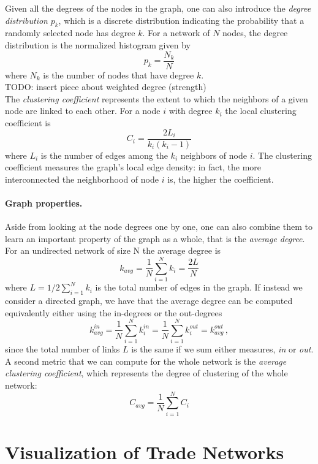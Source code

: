 Given all the degrees of the nodes in the graph, one can also introduce the \textit{degree distribution} $p_k$, which is a discrete distribution indicating the probability that a randomly selected node has degree $k$. For a network of $N$ nodes, the degree distribution is the normalized histogram given by 
\[ p_k = \frac{N_k}{N} \]
where $N_k$ is the number of nodes that have degree $k$. \\

TODO: insert piece about weighted degree (strength) \\

The \textit{clustering coefficient} represents the extent to which the neighbors of a given node are linked to each other. For a node $i$ with degree $k_i$ the local clustering coefficient is
\[
    C_i = \frac{2 L_i}{k_i(k_i-1)}
\]
where $L_i$ is the number of edges among the $k_i$ neighbors of node $i$.
The clustering coefficient measures the graph's local edge density: in fact, the more interconnected the neighborhood of node $i$ is, the higher the coefficient.

\paragraph{Graph properties.}
Aside from looking at the node degrees one by one, one can also combine them to learn an important property of the graph as a whole, that is the \textit{average degree}. For an undirected network of size N the average degree is 
\[ k_{avg} = \frac{1}{N}\sum_{i=1}^N k_i = \frac{2 L }{N} \]
where $L = 1/2 \sum_{i=1}^N k_i$ is the total number of edges in the graph. If instead we consider a directed graph, we have that the average degree can be computed equivalently either using the in-degrees or the out-degrees
\[
    k_{avg}^{in} = \frac{1}{N} \sum_{i=1}^N k_i^{in} = \frac{1}{N} \sum_{i=1}^N k_i^{out} = k_{avg}^{out}\,,
\]
since the total number of links $L$ is the same if we sum either measures, \textit{in} or \textit{out}.
A second metric that we can compute for the whole network is the \textit{average clustering coefficient}, which represents the degree of clustering of the whole network:
\[
    C_{avg} = \frac{1}{N} \sum_{i=1}^N C_i
\]

\pagebreak
\section{Visualization of Trade Networks}

